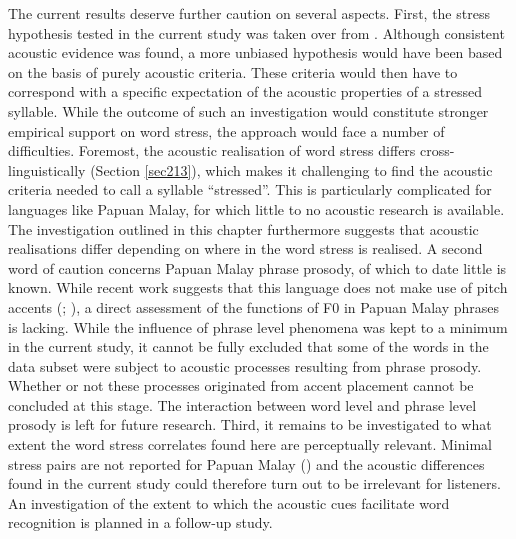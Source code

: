 The current results deserve further caution on several aspects. First, the stress hypothesis tested in the current study was taken over from \citet{kluge_grammar_2017}. Although consistent acoustic evidence was found, a more unbiased hypothesis would have been based on the basis of purely acoustic criteria. These criteria would then have to correspond with a specific expectation of the acoustic properties of a stressed syllable. While the outcome of such an investigation would constitute stronger empirical support on word stress, the approach would face a number of difficulties. Foremost, the acoustic realisation of word stress differs cross-linguistically (Section \ref{sec213}), which makes it challenging to find the acoustic criteria needed to call a syllable ``stressed''. This is particularly complicated for languages like Papuan Malay, for which little to no acoustic research is available. The investigation outlined in this chapter furthermore suggests that acoustic realisations differ depending on where in the word stress is realised. A second word of caution concerns Papuan Malay phrase prosody, of which to date little is known. While recent work suggests that this language does not make use of pitch accents (\citealt{kaland_repetition_2018}; \citealt{riesberg_perception_2018}), a direct assessment of the functions of F0 in Papuan Malay phrases is lacking. While the influence of phrase level phenomena was kept to a minimum in the current study, it cannot be fully excluded that some of the words in the data subset were subject to acoustic processes resulting from phrase prosody. Whether or not these processes originated from accent placement cannot be concluded at this stage. The interaction between word level and phrase level prosody is left for future research. Third, it remains to be investigated to what extent the word stress correlates found here are perceptually relevant. Minimal stress pairs are not reported for Papuan Malay (\citealt{kluge_grammar_2017}) and the acoustic differences found in the current study could therefore turn out to be irrelevant for listeners. An investigation of the extent to which the acoustic cues facilitate word recognition is planned in a follow-up study.
